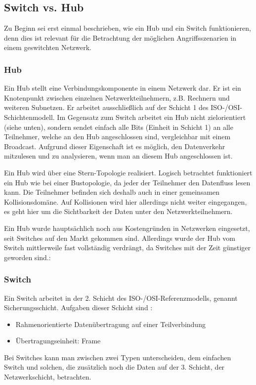 \subsection{Switch vs. Hub}
\label{sec:geswitchtes_netz}

Zu Beginn sei erst einmal beschrieben, wie ein Hub und ein Switch funktionieren, denn dies ist relevant für die Betrachtung der möglichen Angriffsszenarien in einem geswitchten Netzwerk.

\subsubsection{Hub}
Ein Hub stellt eine Verbindungskomponente in einem Netzwerk dar. Er ist ein Knotenpunkt zwischen einzelnen Netzwerkteilnehmern, z.B. Rechnern und weiteren Subnetzen.
Er arbeitet ausschließlich auf der Schicht 1 des ISO-/OSI-Schichtenmodell. Im Gegensatz zum Switch arbeitet ein Hub nicht zielorientiert (siehe unten), sondern sendet einfach alle Bits (Einheit in Schicht 1) an alle Teilnehmer, welche an den Hub angeschlossen sind, vergleichbar mit einem Broadcast. Aufgrund dieser Eigenschaft ist es möglich, den Datenverkehr mitzulesen und zu analysieren, wenn man an diesem Hub angeschlossen ist.

Ein Hub wird über eine Stern-Topologie realisiert.
Logisch betrachtet funktioniert ein Hub wie bei einer Bustopologie, da jeder der Teilnehmer den Datenfluss lesen kann. Die Teilnehmer befinden sich deshalb auch in einer gemeinsamen Kollisionsdomäne. Auf Kollisionen wird hier allerdings nicht weiter eingegangen, es geht hier um die Sichtbarkeit der Daten unter den Netzwerkteilnehmern.

Ein Hub wurde hauptsächlich noch aus Kostengründen in Netzwerken eingesetzt, seit Switches auf den Markt gekommen sind. Allerdings wurde der Hub vom Switch mittlerweile fast vollständig verdrängt, da Switches mit der Zeit günstiger geworden sind.\cite[vgl.]{riggert}:

\subsubsection{Switch}
Ein Switch arbeitet in der 2. Schicht des ISO-/OSI-Referenzmodells, genannt Sicherungsschicht.
Aufgaben dieser Schicht sind \cite[vgl.]{netzwerkeI}:
\begin{itemize}
\item Rahmenorientierte Datenübertragung auf einer Teilverbindung
\item Übertragungseinheit: Frame
\end{itemize}
Bei Switches kann man zwischen zwei Typen unterscheiden, dem einfachen Switch und solchen, die zusätzlich noch die Daten auf der 3. Schicht, der Netzwerkschicht, betrachten.

